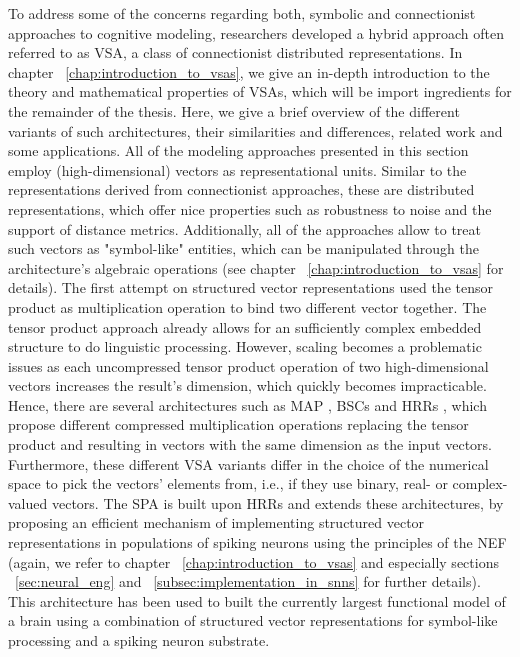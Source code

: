 To address some of the concerns regarding both, symbolic and connectionist approaches to cognitive modeling, researchers developed a hybrid approach often referred to as \acf{VSA}, a class of connectionist distributed representations.
In chapter ~\ref{chap:introduction_to_vsas}, we give an in-depth introduction to the theory and mathematical properties of \acp{VSA}, which will be import ingredients for the remainder of the thesis.
Here, we give a brief overview of the different variants of such architectures, their similarities and differences, related work and some applications.
All of the modeling approaches presented in this section employ (high-dimensional) vectors as representational units.
Similar to the representations derived from connectionist approaches, these are distributed representations, which offer nice properties such as robustness to noise and the support of distance metrics.
Additionally, all of the approaches allow to treat such vectors as "symbol-like" entities, which can be manipulated through the architecture's algebraic operations (see chapter ~\ref{chap:introduction_to_vsas} for details).
The first attempt on structured vector representations used the tensor product as multiplication operation \cite{Smolensky1990} to bind two different vector together.
The tensor product approach already allows for an sufficiently complex embedded structure to do linguistic processing.
However, scaling becomes a problematic issues as each uncompressed tensor product operation of two high-dimensional vectors increases the result's dimension, which quickly becomes impracticable.
Hence, there are several architectures such as \ac{MAP} \cite{Gayler1998, Gayler2003}, \acp{BSC} \cite{Kanerva1988} and \acp{HRR} \cite{Plate1991, Plate1994}, which propose different compressed multiplication operations replacing the tensor product and resulting in vectors with the same dimension as the input vectors.
Furthermore, these different \ac{VSA} variants differ in the choice of the numerical space to pick the vectors' elements from, i.e., if they use binary, real- or complex-valued vectors. 
The \ac{SPA} \cite{Eliasmith2013} is built upon \acp{HRR} and extends these architectures, by proposing an efficient mechanism of implementing structured vector representations in populations of spiking neurons using the principles of the \ac{NEF} \cite{Eliasmith2003} (again, we refer to chapter ~\ref{chap:introduction_to_vsas} and especially sections ~\ref{sec:neural_eng} and ~\ref{subsec:implementation_in_snns} for further details).   
This architecture has been used to built the currently largest functional model of a brain \cite{Eliasmith2012} using a combination of structured vector representations for symbol-like processing and a spiking neuron substrate.

